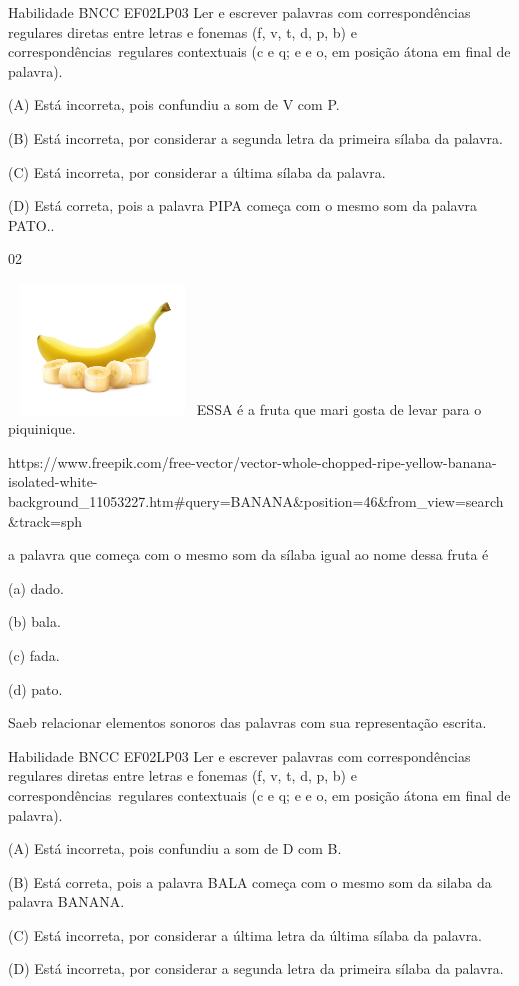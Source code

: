{{{{{{Habilidade BNCC EF02LP03 Ler e escrever palavras com correspondências
regulares diretas entre letras e fonemas (f, v, t, d, p, b) e
correspondências~regulares contextuais (c e q; e e o, em posição átona
em final de palavra).

(A) Está incorreta, pois confundiu a som de V com P.

(B) Está incorreta, por considerar a segunda letra da primeira sílaba da
palavra.

(C) Está incorreta, por considerar a última sílaba da palavra.

(D) Está correta, pois a palavra PIPA começa com o mesmo som da palavra
PATO..

\num{02}

\includegraphics[width=1.96704in,height=1.37153in]{media/image175.jpeg}ESSA
é a fruta que mari gosta de levar para o piquinique.

https://www.freepik.com/free-vector/vector-whole-chopped-ripe-yellow-banana-isolated-white-background\_11053227.htm\#query=BANANA\&position=46\&from\_view=search\&track=sph

a palavra que começa com o mesmo som da sílaba igual ao nome dessa fruta
é

(a) dado.

(b) bala.

(c) fada.

(d) pato.

Saeb relacionar elementos sonoros das palavras com sua representação
escrita.

Habilidade BNCC EF02LP03 Ler e escrever palavras com correspondências
regulares diretas entre letras e fonemas (f, v, t, d, p, b) e
correspondências~regulares contextuais (c e q; e e o, em posição átona
em final de palavra).

(A) Está incorreta, pois confundiu a som de D com B.

(B) Está correta, pois a palavra BALA começa com o mesmo som da silaba
da palavra BANANA.

(C) Está incorreta, por considerar a última letra da última sílaba da
palavra.

(D) Está incorreta, por considerar a segunda letra da primeira sílaba da
palavra.

}}}}}}
